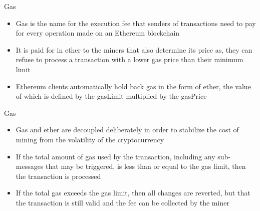 \documentclass[11pt]{beamer}
\begin{document}


\begin{frame}{Gas}
	\begin{itemize}
		\item Gas is the name for the execution fee that senders of transactions need to pay for every operation made on an Ethereum blockchain
		\item It is paid for in ether to the miners that also determine its price as, they can refuse to process a transaction with a lower gas price than their minimum limit
		\item Ethereum clients automatically hold back gas in the form of ether, the value of which is defined by the gasLimit multiplied by the gasPrice
	\end{itemize}
\end{frame}


\begin{frame}{Gas}
	\begin{itemize}
		\item Gas and ether are decoupled deliberately in order to stabilize the cost of mining from the volatility of the cryptocurrency
		\item If the total amount of gas used by the transaction, including any sub-messages that may be triggered, is less than or equal to the gas limit, then the transaction is processed
		\item If the total gas exceeds the gas limit, then all changes are reverted, but that the transaction is still valid and the fee can be collected by the miner
	\end{itemize}
\end{frame}

\end{document}

